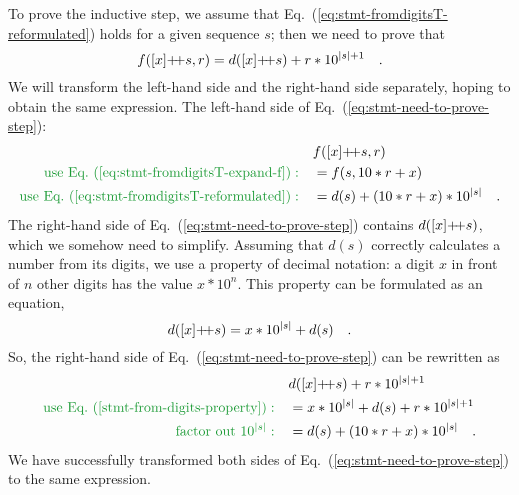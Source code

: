 To prove the inductive step, we assume that Eq.~(\ref{eq:stmt-fromdigitsT-reformulated})
holds for a given sequence $s$; then we need to prove that
\begin{equation}
f([x]{\displaystyle }{+\negmedspace+} s,r)=d([x]{\displaystyle }{+\negmedspace+} s)+r*10^{\left|s\right|+1}\quad.\label{eq:stmt-need-to-prove-step}
\end{equation}
We will transform the left-hand side and the right-hand side separately,
hoping to obtain the same expression. The left-hand side of Eq.~(\ref{eq:stmt-need-to-prove-step}):
\begin{align*}
 & f([x]\pplus s,r)\\
{\color{greenunder}\text{use Eq.~(\ref{eq:stmt-fromdigitsT-expand-f})}:}\quad & =f(s,10*r+x)\\
{\color{greenunder}\text{use Eq.~(\ref{eq:stmt-fromdigitsT-reformulated})}:}\quad & =d(s)+\left(10*r+x\right)*10^{\left|s\right|}\quad.
\end{align*}
The right-hand side of Eq.~(\ref{eq:stmt-need-to-prove-step}) contains
$d([x]{\displaystyle }{+\negmedspace+} s)$, which we somehow need to simplify. Assuming that
$d(s)$ correctly calculates a number from its digits, we use a property
of decimal notation: a digit $x$ in front of $n$ other digits has
the value $x*10^{n}$. This property can be formulated as an equation,
\begin{equation}
d([x]{\displaystyle }{+\negmedspace+} s)=x*10^{\left|s\right|}+d(s)\quad.\label{stmt-from-digits-property}
\end{equation}
So, the right-hand side of Eq.~(\ref{eq:stmt-need-to-prove-step})
can be rewritten as
\begin{align*}
 & d([x]\pplus s)+r*10^{\left|s\right|+1}\\
{\color{greenunder}\text{use Eq.~(\ref{stmt-from-digits-property})}:}\quad & =x*10^{\left|s\right|}+d(s)+r*10^{\left|s\right|+1}\\
{\color{greenunder}\text{factor out }10^{\left|s\right|}:}\quad & =d(s)+\left(10*r+x\right)*10^{\left|s\right|}\quad.
\end{align*}
We have successfully transformed both sides of Eq.~(\ref{eq:stmt-need-to-prove-step})
to the same expression.

